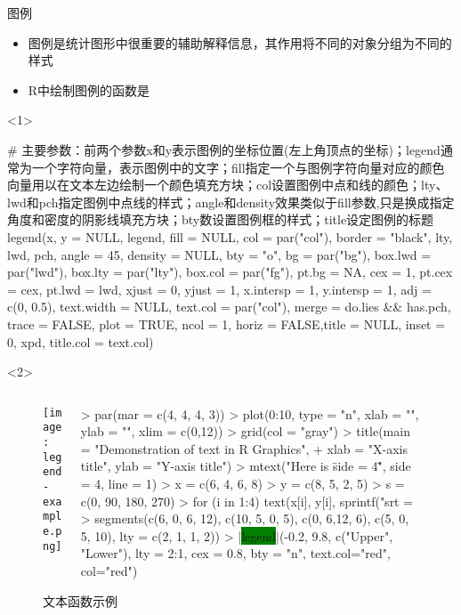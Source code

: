\begin{frame}[t,fragile]{\subsecname}{图例}
\begin{itemize}
\item 图例是统计图形中很重要的辅助解释信息，其作用将不同的对象分组为不同的样式
\item R中绘制图例的函数是
\end{itemize}

\begin{onlyenv}<1>
\begin{rcode}
# 主要参数：前两个参数x和y表示图例的坐标位置(左上角顶点的坐标)；legend通常为一个字符向量，表示图例中的文字；fill指定一个与图例字符向量对应的颜色向量用以在文本左边绘制一个颜色填充方块；col设置图例中点和线的颜色；lty、lwd和pch指定图例中点线的样式；angle和density效果类似于fill参数,只是换成指定角度和密度的阴影线填充方块；bty数设置图例框的样式；title设定图例的标题
legend(x, y = NULL, legend, fill = NULL, col = par("col"), border = "black", lty, lwd, pch, angle = 45, density = NULL, bty = "o", bg = par("bg"), box.lwd = par("lwd"), box.lty = par("lty"), box.col = par("fg"), pt.bg = NA, cex = 1, pt.cex = cex, pt.lwd = lwd, xjust = 0, yjust = 1, x.intersp = 1, y.intersp = 1, adj = c(0, 0.5), text.width = NULL, text.col = par("col"), merge = do.lies && has.pch, trace = FALSE, plot = TRUE, ncol = 1, horiz = FALSE,title = NULL, inset = 0, xpd, title.col = text.col)
\end{rcode}
\end{onlyenv}  

\begin{onlyenv}<2>
\begin{figure}
 \begin{columns}
    \begin{column}[c]{.4\textwidth}
        \texttt{[image: legend-example.png]}
    \end{column}

    \begin{column}[c]{.6\textwidth}
\begin{rcode}
> par(mar = c(4, 4, 4, 3))
> plot(0:10, type = "n", xlab = "", ylab = "", xlim = c(0,12))
> grid(col = "gray")
> title(main = "Demonstration of text in R Graphics",
+ xlab = "X-axis title", ylab = "Y-axis title")
> mtext("Here is \"side = 4\"", side = 4, line = 1)
> x = c(6, 4, 6, 8)
> y = c(8, 5, 2, 5)
> s = c(0, 90, 180, 270)
> for (i in 1:4) text(x[i], y[i], sprintf("srt = %
> segments(c(6, 0, 6, 12), c(10, 5, 0, 5), c(0, 6,12, 6), c(5, 0, 5, 10), lty = c(2, 1, 1, 2))
> |\colorbox{green}{legend}|(-0.2, 9.8, c("Upper", "Lower"), lty = 2:1, cex = 0.8, bty = "n", text.col="red", col="red")
\end{rcode}
    \end{column}
  \end{columns}
  \caption{文本函数示例}
\end{figure}
\end{onlyenv}
\end{frame}

